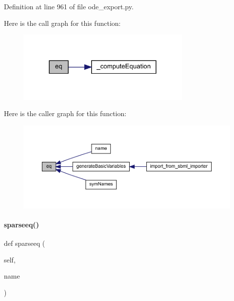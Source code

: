 Definition at line 961 of file ode\+\_\+export.\+py.

Here is the call graph for this function\+:
\nopagebreak
\begin{figure}[H]
\begin{center}
\leavevmode
\includegraphics[width=244pt]{classamici_1_1ode__export_1_1_o_d_e_model_addafc9d839b53dbe76461d8ac6dba604_cgraph}
\end{center}
\end{figure}
Here is the caller graph for this function\+:
\nopagebreak
\begin{figure}[H]
\begin{center}
\leavevmode
\includegraphics[width=350pt]{classamici_1_1ode__export_1_1_o_d_e_model_addafc9d839b53dbe76461d8ac6dba604_icgraph}
\end{center}
\end{figure}
\mbox{\label{classamici_1_1ode__export_1_1_o_d_e_model_ade69c458d3c7069f0b062d796f68d1da}} 
\paragraph{\texorpdfstring{sparseeq()}{sparseeq()}}
{\footnotesize\ttfamily def sparseeq (\begin{DoxyParamCaption}\item[{}]{self,  }\item[{}]{name }\end{DoxyParamCaption})}


